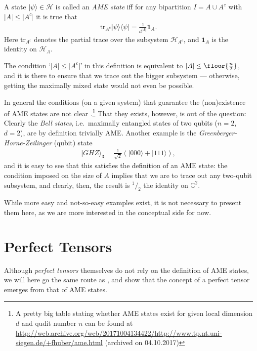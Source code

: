 \begin{definition}
A state $|\psi\rangle\in\mathcal{H}$ is called an \emph{AME state} iff for any bipartition $I=A\cup A^c$ with $\lvert A \rvert \leq \lvert A^c \rvert$ it is true that
\begin{align*}
\mathrm{tr}_{A^c} |\psi\rangle\langle\psi| = \frac{1}{d^{\lvert A \rvert}}\mathbf{1}_{A}.
\end{align*}
Here $\mathrm{tr}_{A^c}$ denotes the partial trace over the subsystem $\mathcal{H}_{A^c}$, and $\mathbf{1}_A$ is the identity on $\mathcal{H}_A$.
\end{definition}
The condition `$\lvert A \rvert \leq \lvert A^c \rvert$' in this definition is equivalent to $\lvert A \rvert\leq\floor{\frac{n}{2}}$, and it is there to ensure that we trace out the bigger subsystem --- otherwise, getting the maximally mixed state would not even be possible.

In general the conditions (on a given system) that guarantee the (non)existence of AME states are not clear \cite{raissi2017constructingQECC}.\footnote{
A pretty big table stating whether AME states exist for given local dimension $d$ and qudit number $n$ can be found at \url{http://web.archive.org/web/20171004134422/http://www.tp.nt.uni-siegen.de/+fhuber/ame.html} (archived on 04.10.2017)
} That they exists, however, is out of the question: Clearly the \emph{Bell states}, i.e.\ maximally entangled states of two qubits ($n=2$, $d=2$), are by definition trivially AME. Another example is the \emph{Greenberger-Horne-Zeilinger} (qubit) state
\begin{align*}
|GHZ\rangle_3 = \frac{1}{\sqrt{2}} \left( |000\rangle+|111\rangle \right),
\end{align*}
and it is easy to see that this satisfies the definition of an AME state: the condition imposed on the size of $A$ implies that we are to trace out any two-qubit subsystem, and clearly, then, the result is ${}^1/_2$ the identity on $\mathbb{C}^2$. 

While more easy and not-so-easy examples exist, it is not necessary to present them here, as we are more interested in the conceptual side for now.

\section{Perfect Tensors}
Although \emph{perfect tensors} themselves do not rely on the definition of AME states, we will here go the same route as \cite{raissi2017constructingQECC}, and
show that the concept of a perfect tensor emerges from that of AME states.

